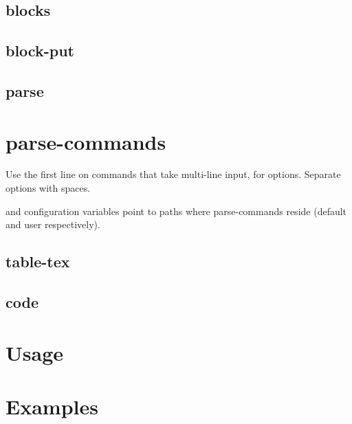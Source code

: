 \documentclass{memoir}
\begin{document}
	\section{blocks}
	\section{block-put}
	\section{parse}


\chapter{parse-commands} %
	Use the first line on commands that take multi-line input, for options.
	Separate options with spaces.

	and  configuration variables point to paths where 
	parse-commands reside (default and user respectively).

	\section{table-tex}
	\section{code}


\chapter{Usage}
\chapter{Examples}

\printglossary
\end{document}
